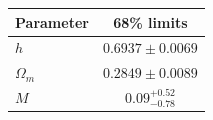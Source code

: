 \begin{tabular} { l  c}

 Parameter &  68\% limits\\
\hline
{\boldmath$h              $} & $0.6937\pm 0.0069          $\\

{\boldmath$\Omega_m       $} & $0.2849\pm 0.0089          $\\

{\boldmath$M              $} & $0.09^{+0.52}_{-0.78}      $\\
\hline
\end{tabular}
